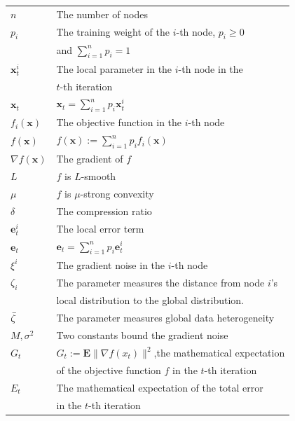 \iffalse
\begin{center}
\begin{tabular}{ |l|l| } 
\hline
 $n$ & The number of nodes  \\ 
$p_i$ & The training weight of the $i$-th node, $p_i \geq 0$ \\
&  and $\sum_{i=1}^{n}p_i=1$ \\
 $\textbf{x}_t^{i}$ & The local parameter in the $i$-th node in the \\&$t$-th iteration \\
 $\textbf{x}_t$ & $\textbf{x}_t=\sum_{i=1}^{n}p_i\textbf{x}_t^{i}$\\
$f_i(\textbf{x})$ & The objective function in the $i$-th node \\
 $f(\textbf{x})$ &  $f(\textbf{x}):=\sum_{i=1}^{n}p_if_i(\textbf{x})$\\
 $\nabla f(\textbf{x})$ & The gradient of $f$\\
$L$ & $f$ is $L$-smooth \\ 
 $\mu$ & $f$ is $\mu$-strong convexity \\
$\delta$ & The compression ratio \\
$\textbf{e}_t^{i}$ & The local error term \\
$\textbf{e}_t$ &  $\textbf{e}_t=\sum_{i=1}^{n}p_i\textbf{e}_t^{i}$\\
$\xi^i$ & The gradient noise in the $i$-th node\\
$\zeta_i$ & The parameter measures the distance from node $i$'s\\&  local distribution to the global distribution.\\
$\Bar{\zeta}$ & The parameter measures global data heterogeneity\\
$M,\sigma^2$ & Two constants bound the gradient noise \\
$G_t$ & $G_t:=\textbf{E}\lVert \nabla f(x_t)\rVert^2$,the mathematical expectation\\&of the objective function $f$ in the $t$-th iteration \\
$E_t$ & The mathematical expectation of the total error \\&in the $t$-th iteration \\


 
 \hline
\end{tabular}
\end{center}


